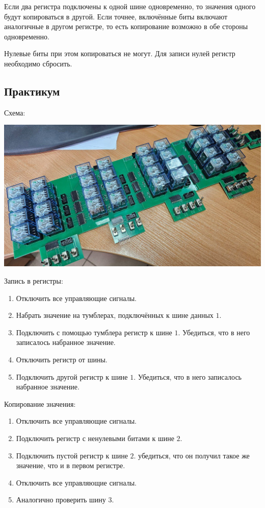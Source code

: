 \documentclass{book}
\begin{document}
Если два регистра подключены к одной шине одновременно,
то значения одного будут копироваться в другой. Если точнее,
включённые биты включают аналогичные в другом регистре, то есть
копирование возможно в обе стороны одновременно.

Нулевые биты при этом копироваться не могут. Для записи нулей
регистр необходимо сбросить.


\subsection{Практикум}

Схема:

\includegraphics[width=\columnwidth]{photo/register_file.jpg}

Запись в регистры:

\begin{enumerate}
    \item Отключить все управляющие сигналы.
    \item Набрать значение на тумблерах, подключённых к шине данных $1$.
    \item Подключить с помощью тумблера регистр к шине $1$. Убедиться, что в него записалось набранное значение.
    \item Отключить регистр от шины.
    \item Подключить другой регистр к шине $1$. Убедиться, что в него записалось набранное значение.
\end{enumerate}

Копирование значения:

\begin{enumerate}
    \item Отключить все управляющие сигналы.
    \item Подключить регистр с ненулевыми битами к шине $2$.
    \item Подключить пустой регистр к шине $2$. убедиться, что он получил такое же значение, что и в первом регистре.
    \item Отключить все управляющие сигналы.
    \item Аналогично проверить шину $3$.
\end{enumerate}
\end{document}

